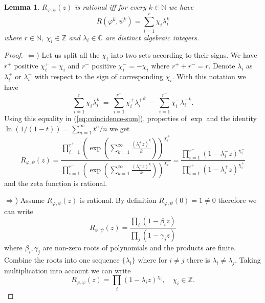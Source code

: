 \documentclass[12pt, a4paper]{amsart}
\def\C{{\mathbb C}}
\def\Z{{\mathbb Z}}
\def\ln{\operatorname{ln}}
\newtheorem{lemma}[theorem]{Lemma}
\def\N{{\mathbb N}}
\begin{document}
\begin{lemma}\label{thm:rational-zeta-coefficients-sum}
  $R_{\varphi, \psi}(z)$ is rational iff for every $k \in \N$ we have
  \begin{equation}\label{eq:coincidence-sum}
    R(\varphi^k, \psi^k) = \sum_{i=1}^{r} \chi_i \lambda_i^k
  \end{equation}
  where $r \in \N, \ \chi_i \in \Z$ and $\lambda_i \in \C$ are distinct algebraic integers.
\end{lemma}
\begin{proof}
  $\Leftarrow$)
  Let us split all the $\chi_i$ into two sets according to their signs.
  We have $r^+$ positive $\chi_i^+ = \chi_i$ and $r^-$ positive $\chi_i^- = -\chi_i$ where $r^+ + r^- = r$.
  Denote $\lambda_i$ as $\lambda_i^+$ or $\lambda_i^-$ with respect to the sign of corresponding $\chi_i$.
  With this notation we have
  \[
    \sum_{i=1}^{r} \chi_i \lambda_i^k \ = \ \sum_{i=1}^{r^+} \chi_i^+ {\lambda_i^+}^k \ - \ \sum_{i=1}^{r^-} \chi_i^- {\lambda_i^-}^k.
  \]
  Using this equality in (\ref{eq:coincidence-sum}), properties of $\exp$
  and the identity $\ln(1/(1-t)) = \sum_{n=1}^\infty t^n/n$ we get
  \[
    R_{\varphi, \psi}(z) =
    \frac{\prod_{i=1}^{r^+} \left( \exp \left( \sum_{k=1}^\infty \frac{(\lambda_i^+ z)^k}{k} \right) \right)^{\chi_i^+}} {\prod_{i=1}^{r^-} \left( \exp \left( \sum_{k=1}^\infty \frac{(\lambda_i^- z)^k}{k} \right) \right)^{\chi_i^-}} =
    \frac{\prod_{i=1}^{r^-} \left( 1-\lambda_i^- z \right)^{\chi_i^-}} {\prod_{i=1}^{r^+} \left( 1-\lambda_i^+ z \right)^{\chi_i^+}}
  \]
  and the zeta function is rational.

  $\Rightarrow$)
  Assume $R_{\varphi, \psi}(z)$ is rational.
  By definition $R_{\varphi, \psi}(0) = 1 \neq 0$ therefore we can write
  \[
    R_{\varphi, \psi}(z) = \frac{\prod_i (1 - \beta_i z)}{\prod_j (1 - \gamma_j z)}
  \]
  where $\beta_i, \gamma_j$ are non-zero roots of polynomials and the products are finite.
  Combine the roots into one sequence $\{\lambda_i\}$ where for $i \neq j$ there is $\lambda_i \neq \lambda_j$.
  Taking multiplication into account we can write
  \begin{equation}\label{eq:zeta-product}
    R_{\varphi, \psi}(z) = \prod_i \left( 1 - \lambda_i z \right)^{\chi_i}, \quad \chi_i \in \Z.
  \end{equation}


\end{proof}
\end{document}
